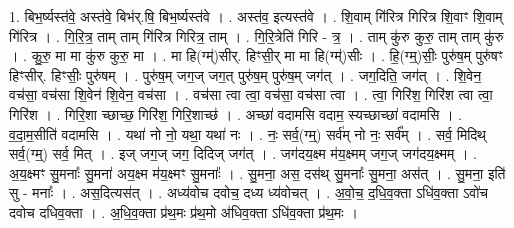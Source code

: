 \documentclass[17pt]{extarticle}
\begin{document}
1. बिभ॒र्ष्यस्त॑वे॒ अस्त॑वे॒ बिभ॑र्.षि॒ बिभ॒र्ष्यस्त॑वे । . अस्त॑व॒ इत्यस्त॑वे । . शि॒वाम् गि॑रित्र गिरित्र शि॒वाꣳ शि॒वाम् गि॑रित्र । . गि॒रि॒त्र॒ ताम् ताम् गि॑रित्र गिरित्र॒ ताम् । . गि॒रि॒त्रेति॑ गिरि - त्र॒ । . ताम् कु॑रु कुरु॒ ताम् ताम् कु॑रु । . कु॒रु॒ मा मा कु॑रु कुरु॒ मा । . मा हि(ग्म्॑)सीर्. हिꣳसी॒र् मा मा हि(ग्म्॑)सीः । . हि॒(ग्म्॒)सीः॒ पुरु॑ष॒म् पुरु॑षꣳ हिꣳसीर्. हिꣳसीः॒ पुरु॑षम् । . पुरु॑ष॒म् जग॒ज् जग॒त् पुरु॑ष॒म् पुरु॑ष॒म् जग॑त् । . जग॒दिति॒ जग॑त् । . शि॒वेन॒ वच॑सा॒ वच॑सा शि॒वेन॑ शि॒वेन॒ वच॑सा । . वच॑सा त्वा त्वा॒ वच॑सा॒ वच॑सा त्वा । . त्वा॒ गिरि॑श॒ गिरि॑श त्वा त्वा॒ गिरि॑श । . गिरि॒शा च्छाच्छ॒ गिरि॑श॒ गिरि॒शाच्छ॑ । . अच्छा॑ वदामसि वदाम॒ स्यच्छाच्छा॑ वदामसि । . व॒दा॒म॒सीति॑ वदामसि । . यथा॑ नो नो॒ यथा॒ यथा॑ नः । . नः॒ सर्व॒(ग्म्॒) सर्व॑म् नो नः॒ सर्व᳚म् । . सर्व॒ मिदिथ् सर्व॒(ग्म्॒) सर्व॒ मित् । . इज् जग॒ज् जग॒ दिदिज् जग॑त् । . जग॑दय॒क्ष्म म॑य॒क्ष्मम् जग॒ज् जग॑दय॒क्ष्मम् । . अ॒य॒क्ष्मꣳ सु॒मनाः᳚ सु॒मना॑ अय॒क्ष्म म॑य॒क्ष्मꣳ सु॒मनाः᳚ । . सु॒मना॒ अस॒ दस॑थ् सु॒मनाः᳚ सु॒मना॒ अस॑त् । . सु॒मना॒ इति॑ सु - मनाः᳚ । . अस॒दित्यस॑त् । . अध्य॑वोच दवोच॒ दध्य ध्य॑वोचत् । . अ॒वो॒च॒ द॒धि॒व॒क्ता ऽधि॑व॒क्ता ऽवो॑च दवोच दधिव॒क्ता । . अ॒धि॒व॒क्ता प्र॑थ॒मः प्र॑थ॒मो अ॑धिव॒क्ता ऽधि॑व॒क्ता प्र॑थ॒मः । \newline
\end{document}
